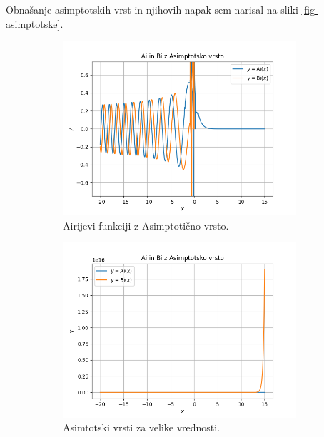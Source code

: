 \documentclass[a4paper, 12pt, slovene]{article}
\begin{document}
Obnašanje asimptotskih vrst in njihovih napak sem narisal na sliki \ref{fig-asimptotske}.

\begin{figure}[H]
\centering
\begin{subfigure}{0.49\textwidth}
	\centering
	\includegraphics[width=0.95\textwidth]{grafi/asimptotska.png}
	\caption{Airijevi funkciji z Asimptotično vrsto.}
	\label{fig-asi}
\end{subfigure}%
\begin{subfigure}{0.49\textwidth}
	\centering
	\includegraphics[width=0.95\textwidth]{grafi/asimptotska_velike.png}
	\caption{Asimtotski vrsti za velike vrednosti.}
	\label{fig-asibig}
\end{subfigure}
\begin{subfigure}{0.49\textwidth}

\end{subfigure}
\end{figure}
\end{document}
